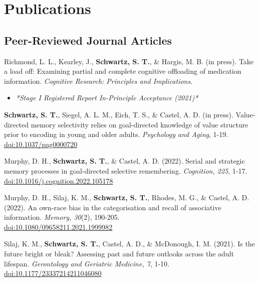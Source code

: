 \section*{Publications}
\subsection*{Peer-Reviewed Journal Articles}
Richmond, L. L., Kearley, J., \textbf{Schwartz, S. T.}, \& Hargis, M. B. (in press). Take a load off: Examining partial and complete cognitive offloading of medication information. \textit{Cognitive Research: Principles and Implications}.
\begin{itemize}[label={}, leftmargin=0.5cm, topsep=0.2cm]
    \item \textit{*Stage I Registered Report In-Principle Acceptance (2021)*}
\end{itemize}

\pubspace

\textbf{Schwartz, S. T.}, Siegel, A. L. M., Eich, T. S., \& Castel, A. D. (in press). Value-directed memory selectivity relies on goal-directed knowledge of value structure prior to encoding in young and older adults. \textit{Psychology and Aging}, 1-19. {\href{https://doi.org/10.1037/pag0000720}{doi:10.1037/pag0000720}}

\pubspace

Murphy, D. H., \textbf{Schwartz, S. T.}, \& Castel, A. D. (2022). Serial and strategic memory processes in goal-directed selective remembering. \textit{Cognition, 225}, 1-17. \textcolor{RoyalBlue}{\href{https://doi.org/10.1016/j.cognition.2022.105178}{doi:10.1016/j.cognition.2022.105178}}

\pubspace

Murphy, D. H., Silaj, K. M., \textbf{Schwartz, S. T.}, Rhodes, M. G., \& Castel, A. D. (2022). An own-race bias in the categorisation and recall of associative information. \textit{Memory, 30}(2), 190-205.\\ \textcolor{RoyalBlue}{\href{https://doi.org/10.1080/09658211.2021.1999982}{doi:10.1080/09658211.2021.1999982}}

\pubspace

Silaj, K. M., \textbf{Schwartz, S. T.}, Castel, A. D., \& McDonough, I. M. (2021). Is the future bright or bleak? Assessing past and future outlooks across the adult lifespan. \textit{Gerontology and Geriatric Medicine, 7}, 1-10. \textcolor{RoyalBlue}{\href{https://doi.org/10.1177/23337214211046080}{doi:10.1177/23337214211046080}}


